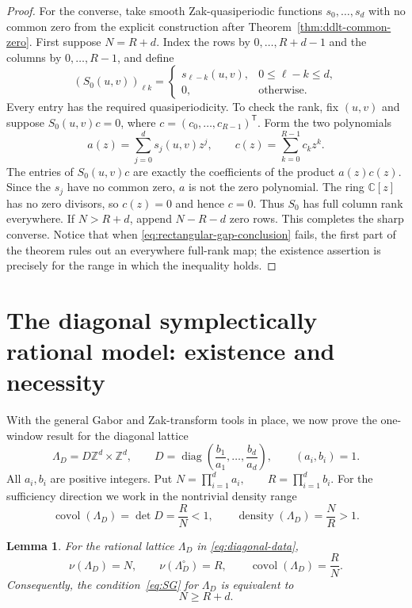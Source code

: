 \documentclass[11pt,reqno]{amsart}
\numberwithin{equation}{section}
\newtheorem{lemma}[theorem]{Lemma}
\theoremstyle{definition}
\theoremstyle{remark}
\newcommand{\Z}{\mathbb Z}
\newcommand{\C}{\mathbb C}
\newcommand{\covol}{\operatorname{covol}}
\begin{document}
\begin{proof}
For the converse, take smooth Zak-quasiperiodic functions
$s_0,\ldots,s_d$ with no common zero from the explicit construction after
Theorem~\ref{thm:ddlt-common-zero}.  First suppose $N=R+d$.  Index the rows
by $0,\ldots,R+d-1$ and the columns by $0,\ldots,R-1$, and define
\[
 (S_0(u,v))_{\ell k}=
 \begin{cases}
  s_{\ell-k}(u,v),&0\le \ell-k\le d,\\
  0,&\text{otherwise}.
 \end{cases}
\]
Every entry has the required quasiperiodicity.  To check the rank, fix
$(u,v)$ and suppose $S_0(u,v)c=0$, where
$c=(c_0,\ldots,c_{R-1})^{\mathsf T}$.  Form the two polynomials
\[
 a(z)=\sum_{j=0}^d s_j(u,v)z^j,
 \qquad
 c(z)=\sum_{k=0}^{R-1}c_kz^k.
\]
The entries of $S_0(u,v)c$ are exactly the coefficients of the product
$a(z)c(z)$.  Since the $s_j$ have no common zero, $a$ is not the zero
polynomial.  The ring $\C[z]$ has no zero divisors, so $c(z)=0$ and hence
$c=0$.  Thus $S_0$ has full column rank everywhere.  If $N>R+d$, append
$N-R-d$ zero rows.  This completes the sharp converse.  Notice that when
\eqref{eq:rectangular-gap-conclusion} fails, the first part of the theorem
rules out an everywhere full-rank map; the existence assertion is precisely
for the range in which the inequality holds.
\end{proof}


\section{The diagonal symplectically rational model: existence and necessity}
\label{sec:diagonal-model}

With the general Gabor and Zak-transform tools in place, we now prove the
one-window result for the diagonal lattice
\begin{equation}\label{eq:diagonal-data}
 \Lambda_D=D\Z^d\times\Z^d,
 \qquad
 D=\operatorname{diag}\left(\frac{b_1}{a_1},\ldots,
                             \frac{b_d}{a_d}\right),
 \qquad (a_i,b_i)=1.
\end{equation}
All $a_i,b_i$ are positive integers.  Put
\(
 N=\prod_{i=1}^d a_i,
 \qquad
 R=\prod_{i=1}^d b_i.
\)
For the sufficiency direction we work in the nontrivial density range
\begin{equation}\label{eq:diagonal-density-range}
 \covol(\Lambda_D)=\det D=\frac{R}{N}<1,
 \qquad
 \operatorname{density}(\Lambda_D)=\frac{N}{R}>1.
\end{equation}

\begin{lemma}
\label{lem:diagonal-arithmetic}
For the rational lattice  $\Lambda_D$ in \eqref{eq:diagonal-data},
\begin{equation}\label{eq:diagonal-invariants}
 \nu(\Lambda_D)=N,
 \qquad
 \nu(\Lambda_D^\circ)=R,
 \qquad
 \covol(\Lambda_D)=\frac{R}{N}.
\end{equation}
Consequently, the condition~\eqref{eq:SG} for $\Lambda_D$ is equivalent to
\begin{equation}\label{eq:diagonal-SG-gap}
                              N\ge R+d.
\end{equation}
\end{lemma}
\end{document}
